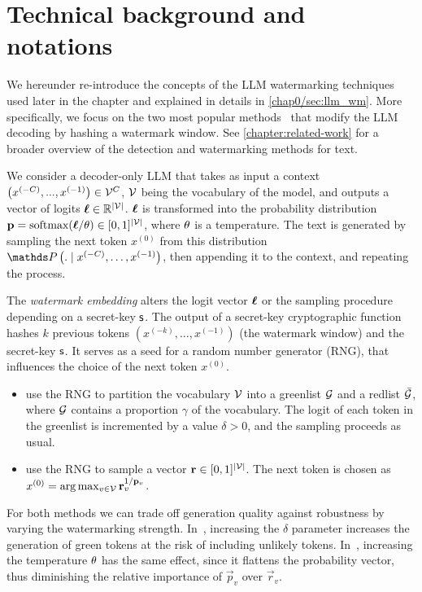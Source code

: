 \section{Technical background and notations}\label{chap5/sec:background}

We hereunder re-introduce the concepts of the LLM watermarking techniques used later in the chapter and explained in details in \autoref{chap0/sec:llm_wm}.
More specifically, we focus on the two most popular methods~\citep{aaronson2023watermarking, kirchenbauer2023watermark} that modify the LLM decoding by hashing a watermark window.
See \autoref{chapter:related-work} for a broader overview of the detection and watermarking methods for text.


We consider a decoder-only LLM that takes as input a context $\left( x^{(-C)}, ..., x^{(-1)} \right)\in \mathcal{V}^C$, $\mathcal{V}$ being the vocabulary of the model, and outputs a vector of logits $\boldsymbol{\ell}\in \mathbb{R}^{|\mathcal{V}|}$.
$\boldsymbol{\ell}$ is transformed into the probability distribution $\mathbf{p}=\text{softmax}(\boldsymbol{\ell} / \theta ) \in [0,1]^{|\mathcal{V}|}$, where $\theta$ is a temperature.
The text is generated by sampling the next token $x^{(0)}$ from this distribution $\Prob \left( . \mid x^{(-C)},\dots, x^{(-1)} \right)$, then appending it to the context, and repeating the process.

The \emph{watermark embedding} alters the logit vector $\boldsymbol{\ell}$ or the sampling procedure depending on a secret-key $\mathsf{s}$.
The output of a secret-key cryptographic function hashes $k$ previous tokens $\left(x^{(-k)},\dots, x^{(-1)} \right)$ (the watermark window) and the secret-key $\mathsf{s}$.
It serves as a seed for a random number generator (RNG), that influences the choice of the next token $x^{(0)}$.
\begin{itemize}
    \item \citet{kirchenbauer2023watermark} use the RNG to partition the vocabulary $\mathcal{V}$ into a greenlist $\mathcal{G}$ and a redlist $\bar{\mathcal{G}}$, where $\mathcal{G}$ contains a proportion $\gamma$ of the vocabulary.
    The logit of each token in the greenlist is incremented by a value $\delta>0$, and the sampling proceeds as usual.
    \item \citet{aaronson2023watermarking} use the RNG to sample a vector $\mathbf{r}\in[0,1]^{|\mathcal{V}|}$.
    The next token is chosen as $x^{(0)} = \arg \max_{v \in \mathcal{V} } \mathbf{r}_v^{1/\mathbf{p}_v}$.
\end{itemize}
For both methods we can trade off generation quality against robustness by varying the watermarking strength.
In~\citep{kirchenbauer2023watermark}, increasing the $\delta$ parameter increases the generation of green tokens at the risk of including unlikely tokens.
In~\citep{aaronson2023watermarking}, increasing the temperature $\theta$ has the same effect, since it flattens the probability vector, thus diminishing the relative importance of $\vec{p}_v$ over $\vec{r}_v$.


